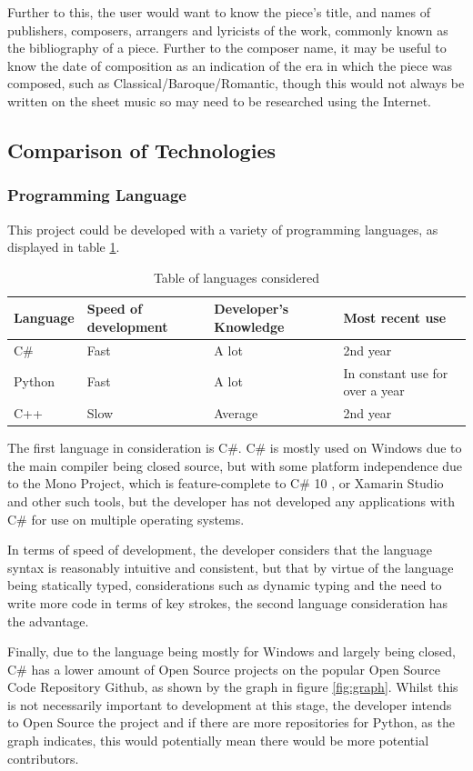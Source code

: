 Further to this, the user would want to know the piece's title, and names of publishers, composers, arrangers and lyricists of the work, commonly known as the bibliography of a piece\parencite{MIR}. Further to the composer name, it may be useful to know the date of composition as an indication of the era in which the piece was composed, such as Classical/Baroque/Romantic, though this would not always be written on the sheet music so may need to be researched using the Internet.

\subsection{Comparison of Technologies}
\subsubsection{Programming Language}
This project could be developed with a variety of programming languages, as displayed in table \ref{table:langs}.

\begin{table}[H]
\centering
\begin{tabular}{| l | l | l | l |} \hline
  {Language} & {Speed of development} & {Developer's Knowledge} & {Most recent use} \\ \hline
  C\# & Fast & A lot & 2nd year \\ \hline
  Python & Fast & A lot & In constant use for over a year \\ \hline
  C++ & Slow & Average & 2nd year \\ \hline
\end{tabular}
\caption{Table of languages considered}
\label{table:langs}
\end{table}
The first language in consideration is C#. C# is mostly used on Windows due to the main compiler being closed source, but with some platform independence due to the Mono Project, which is feature-complete to C\# 10 \parencite{MonoDev}, or Xamarin Studio and other such tools, but the developer has not developed any applications with C\# for use on multiple operating systems. 

In terms of speed of development, the developer considers that the language syntax is reasonably intuitive and consistent, but that by virtue of the language being statically typed, considerations such as dynamic typing and the need to write more code in terms of key strokes, the second language consideration has the advantage.

Finally, due to the language being mostly for Windows and largely being closed, C# has a lower amount of Open Source projects on the popular Open Source Code Repository Github, as shown by the graph in figure \ref{fig:graph}. Whilst this is not necessarily important to development at this stage, the developer intends to Open Source the project and if there are more repositories for Python, as the graph indicates, this would potentially mean there would be more potential contributors.

